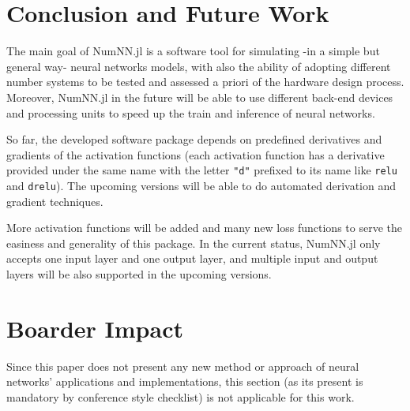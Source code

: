 \section{Conclusion and Future Work}

The main goal of NumNN.jl is a software tool for simulating -in a simple but general way- neural networks models, with also the ability of adopting different number systems to be tested and assessed a priori of the hardware design process. Moreover, NumNN.jl in the future will be able to use different back-end devices and processing units to speed up the train and inference of neural networks. 

So far, the developed software package depends on predefined derivatives and gradients of the activation functions (each activation function has a derivative provided under the same name with the letter \texttt{"d"} prefixed to its name like \texttt{relu} and \texttt{drelu}). The upcoming versions will be able to do automated derivation and gradient techniques.

More activation functions will be added and many new loss functions to serve the easiness and generality of this package. In the current status, NumNN.jl only accepts one input layer and one output layer, and multiple input and output layers will be also supported in the upcoming versions.


\section*{Boarder Impact}

Since this paper does not present any new method or approach of neural networks' applications and implementations, this section (as its present is mandatory by conference style checklist) is not applicable for this work.